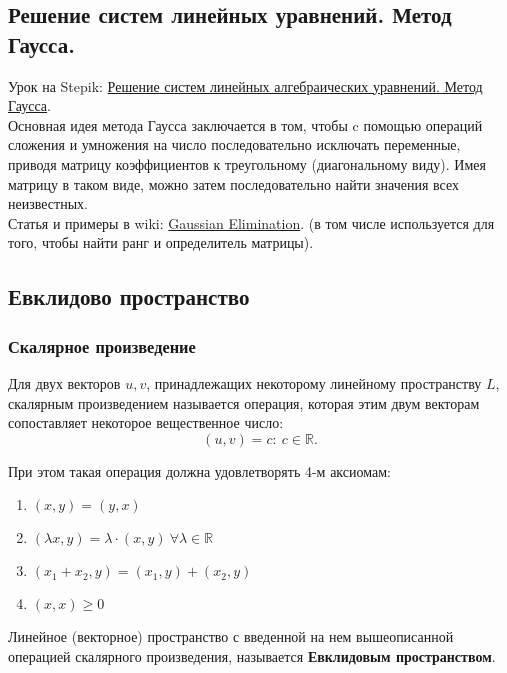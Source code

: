 \documentclass{article}
\begin{document}
\subsection{Решение систем линейных уравнений. Метод Гаусса.}

Урок на Stepik: \href{https://stepik.org/lesson/9582/step/1?unit=23533}{Решение систем линейных алгебраических уравнений. Метод Гаусса}. \\

Основная идея метода Гаусса заключается в том, чтобы c помощью операций сложения и умножения на число последовательно исключать переменные, приводя матрицу коэффициентов к треугольному (диагональному виду). Имея матрицу в таком виде, можно затем последовательно найти значения всех неизвестных. \\

Статья и примеры в wiki: \href{https://en.wikipedia.org/wiki/Gaussian_elimination}{Gaussian Elimination}. (в том числе используется для того, чтобы найти ранг и определитель матрицы).

\subsection{Евклидово пространство}

\subsubsection{Скалярное произведение}

Для двух векторов $u, v$, принадлежащих некоторому линейному пространству $L$, скалярным произведением называется операция, которая этим двум векторам сопоставляет некоторое вещественное число: $$(u, v) = c: \ c \in \mathbb{R}.$$

При этом такая операция должна удовлетворять 4-м аксиомам:

\begin{enumerate}
	\item $(x, y) = (y, x)$
	\item $(\lambda x, y) = \lambda \cdot (x, y) \ \forall \lambda \in \mathbb{R}$
	\item $(x_1 + x_2, y) = (x_1, y) + (x_2, y)$
	\item $(x, x) \ge 0$
\end{enumerate}

Линейное (векторное) пространство с введенной на нем вышеописанной операцией скалярного произведения, называется \textbf{Евклидовым пространством}. \\
\end{document}
